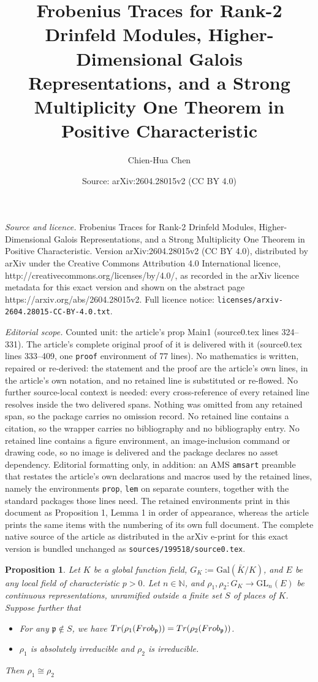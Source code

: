 \documentclass[10pt,a4paper]{amsart}
\title{Frobenius Traces for Rank-2 Drinfeld Modules, Higher-Dimensional Galois Representations, and a Strong Multiplicity One Theorem in Positive Characteristic}
\author{Chien-Hua Chen}
\date{Source: arXiv:2604.28015v2 (CC BY 4.0)}
\newtheorem{prop}{Proposition}
\newcommand{\GL}{\mathrm{GL}}
\newcommand{\Gal}{\mathrm{Gal}}
\newcommand{\fp}{\mathfrak{p}}
\begin{document}
\maketitle

\noindent\emph{Source and licence.} Frobenius Traces for Rank-2 Drinfeld Modules, Higher-Dimensional Galois Representations, and a Strong Multiplicity One Theorem in Positive Characteristic. Version arXiv:2604.28015v2 (CC BY 4.0), distributed by arXiv under the Creative Commons Attribution 4.0 International licence, http://creativecommons.org/licenses/by/4.0/, as recorded in the arXiv licence metadata for this exact version and shown on the abstract page https://arxiv.org/abs/2604.28015v2. Full licence notice: \texttt{licenses/arxiv-2604.28015-CC-BY-4.0.txt}.\par\smallskip

\noindent\textit{Editorial scope.} Counted unit: the article's prop Main1 (source0.tex lines 324--331). The article's complete original proof of it is delivered with it (source0.tex lines 333--409, one \texttt{proof} environment of 77 lines). No mathematics is written, repaired or re-derived: the statement and the proof are the article's own lines, in the article's own notation, and no retained line is substituted or re-flowed.  No further source-local context is needed: every cross-reference of every retained line resolves inside the two delivered spans.  Nothing was omitted from any retained span, so the package carries no omission record.  No retained line contains a citation, so the wrapper carries no bibliography and no bibliography entry.  No retained line contains a figure environment, an image-inclusion command or drawing code, so no image is delivered and the package declares no asset dependency.  Editorial formatting only, in addition: an AMS \texttt{amsart} preamble that restates the article's own declarations and macros used by the retained lines, namely the environments \texttt{prop}, \texttt{lem} on separate counters, together with the standard packages those lines need.  The retained environments print in this document as Proposition 1, Lemma 1 in order of appearance, whereas the article prints the same items with the numbering of its own full document.  The complete native source of the article as distributed in the arXiv e-print for this exact version is bundled unchanged as \texttt{sources/199518/source0.tex}.
\begin{prop}\label{Main1}
Let $K$ be a global function field, $G_K:=\Gal(\bar{K}/K)$, and $E$ be any local field of characteristic $p>0$. Let $n\in \mathbb{N}$, and $\rho_1, \rho_2:G_K\rightarrow \GL_n(E)$ be continuous representations, unramified outside a finite set $S$ of places of $K$. Suppose further that
\begin{itemize}
\item For any $ \fp\not\in S$, we have ${\rm Tr}(\rho_1({\rm Frob}_\fp))={\rm Tr}(\rho_2({\rm Frob}_\fp))$.
\item $\rho_1$ is absolutely irreducible and $\rho_2$ is irreducible.
\end{itemize}
Then $\rho_1\cong\rho_2$
\end{prop}
\end{document}

